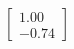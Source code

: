 \documentclass[preview]{standalone}
\begin{document}
\begin{align*}
\begin{bmatrix} 1.00 \\ -0.74 \end{bmatrix}
\end{align*}
\end{document}
